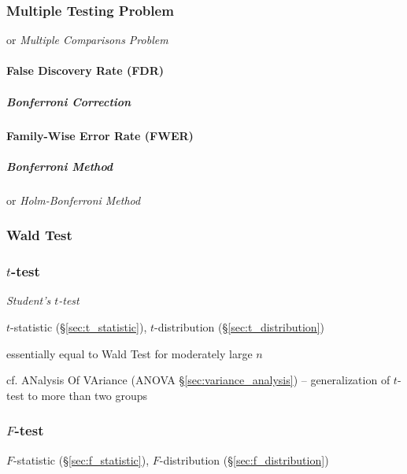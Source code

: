 \subsubsection{Multiple Testing Problem}\label{sec:multiple_testing}

or \emph{Multiple Comparisons Problem}




\paragraph{False Discovery Rate (FDR)}\label{sec:fdr}\hfill

\subparagraph{Bonferroni Correction}\label{sec:bonferroni_correction}\hfill



\paragraph{Family-Wise Error Rate (FWER)}\label{sec:fwer}\hfill

\subparagraph{Bonferroni Method}\label{sec:bonferroni_method}\hfill

or \emph{Holm-Bonferroni Method}



\subsubsection{Wald Test}\label{sec:wald_test}

\subsubsection{$t$-test}\label{sec:t_test}

\emph{Student's $t$-test}

\fist $t$-statistic (\S\ref{sec:t_statistic}), $t$-distribution
(\S\ref{sec:t_distribution})

essentially equal to Wald Test for moderately large $n$

\fist cf. ANalysis Of VAriance (ANOVA \S\ref{sec:variance_analysis}) --
generalization of $t$-test to more than two groups



\subsubsection{$F$-test}\label{sec:f_test}

\fist $F$-statistic (\S\ref{sec:f_statistic}),
$F$-distribution (\S\ref{sec:f_distribution})

